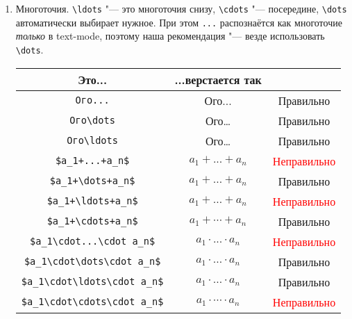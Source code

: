 \documentclass[12pt,a4paper]{book}
\newcommand{\ok}{& \textcolor{green!60!black}{Правильно}}
\newcommand{\bad}{& \textcolor{red}{Неправильно}}
\begin{document}
\begin{enumerate}
\item
	Многоточия.
	\verb!\ldots! "--- это многоточия снизу, \verb!\cdots! "--- посередине, \verb!\dots! автоматически выбирает нужное.
	При этом \verb!...! распознаётся как многоточие \textit{только} в text-mode, 
	поэтому наша рекомендация "--- везде использовать \verb!\dots!.
	\begin{center}\begin{tabular}{|c|c|c|}
		\hline Это... & ...верстается так & \\
		\hline \verb!Ого...! & Ого... \ok \\
		\hline \verb!Ого\dots! & Ого\dots \ok \\
		\hline \verb!Ого\ldots! & Ого\ldots \ok \\
		\hline \verb!$a_1+...+a_n$! & $a_1+...+a_n$ \bad \\
		\hline \verb!$a_1+\dots+a_n$! & $a_1+\dots+a_n$ \ok \\
		\hline \verb!$a_1+\ldots+a_n$! & $a_1+\ldots+a_n$ \bad \\
		\hline \verb!$a_1+\cdots+a_n$! & $a_1+\cdots+a_n$ \ok \\
		\hline \verb!$a_1\cdot...\cdot a_n$! & $a_1\cdot ... \cdot a_n$ \bad \\
		\hline \verb!$a_1\cdot\dots\cdot a_n$! & $a_1\cdot\dots\cdot a_n$ \ok \\
		\hline \verb!$a_1\cdot\ldots\cdot a_n$! & $a_1\cdot\ldots\cdot a_n$ \ok \\
		\hline \verb!$a_1\cdot\cdots\cdot a_n$! & $a_1\cdot\cdots\cdot a_n$ \bad \\
		\hline
	\end{tabular}\end{center}


\end{enumerate}
\end{document}
